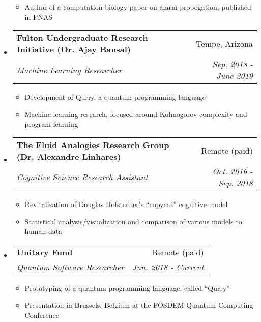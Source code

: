\documentclass[letterpaper,11pt]{article}
\makeatletter
\newcommand{\resitem}[1]{\item #1 \vspace{-3pt}}
\newcommand{\colfill}{@{\extracolsep{\fill}}}
\newcommand{\ressubheading}[4]{
\begin{tabular*}{6.5in}{l\colfill r}
		\textbf{#1} & #2 \\
		\textit{#3} & \textit{#4} \\
\end{tabular*}\vspace{-6pt}}
\makeatother
\begin{document}
\begin{itemize}
\begin{itemize}
        \resitem{Author of a computation biology paper on alarm propogation, published in PNAS}
 	\end{itemize}
 \item
     \ressubheading{Fulton Undergraduate Research Initiative (Dr. Ajay Bansal)}{Tempe, Arizona}{Machine Learning Researcher}{Sep. 2018 - June 2019}
 	\begin{itemize}
        \resitem{Development of Qurry, a quantum programming language}
        \resitem{Machine learning research, focused around Kolmogorov complexity and program learning}
 	\end{itemize}
 \item
    \ressubheading{The Fluid Analogies Research Group (Dr. Alexandre Linhares)}{Remote (paid)}{Cognitive Science Research Assistant}{Oct. 2016 - Sep. 2018}
 	\begin{itemize}
 		\resitem{Revitalization of Douglas Hofstadter's ``copycat'' cognitive model}
 		\resitem{Statistical analysis/visualization and comparison of various models to human data}
 	\end{itemize}
 \item
     \ressubheading{Unitary Fund}{Remote (paid)}{Quantum Software Researcher}{Jun. 2018 - Current}
 	\begin{itemize}
            \resitem{Prototyping of a quantum programming language, called ``Qurry''}
            \resitem{Presentation in Brussels, Belgium at the FOSDEM Quantum Computing Conference}
 	\end{itemize}
\end{itemize}
\end{document}
